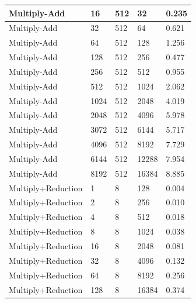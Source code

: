 \documentclass{article}
\begin{document}
\begin{longtable}{|l|l|l|l|l|}
Multiply-Add       & 16   & 512         & 32                & 0.235             \\ \hline
Multiply-Add       & 32   & 512         & 64                & 0.621             \\ \hline
Multiply-Add       & 64   & 512         & 128               & 1.256             \\ \hline
Multiply-Add       & 128  & 512         & 256               & 0.477             \\ \hline
Multiply-Add       & 256  & 512         & 512               & 0.955             \\ \hline
Multiply-Add       & 512  & 512         & 1024              & 2.062             \\ \hline
Multiply-Add       & 1024 & 512         & 2048              & 4.019             \\ \hline
Multiply-Add       & 2048 & 512         & 4096              & 5.978             \\ \hline
Multiply-Add       & 3072 & 512         & 6144              & 5.717             \\ \hline
Multiply-Add       & 4096 & 512         & 8192              & 7.729             \\ \hline
Multiply-Add       & 6144 & 512         & 12288             & 7.954             \\ \hline
Multiply-Add       & 8192 & 512         & 16384             & 8.885             \\ \hline
Multiply+Reduction & 1    & 8           & 128               & 0.004             \\ \hline
Multiply+Reduction & 2    & 8           & 256               & 0.010             \\ \hline
Multiply+Reduction & 4    & 8           & 512               & 0.018             \\ \hline
Multiply+Reduction & 8    & 8           & 1024              & 0.038             \\ \hline
Multiply+Reduction & 16   & 8           & 2048              & 0.081             \\ \hline
Multiply+Reduction & 32   & 8           & 4096              & 0.132             \\ \hline
Multiply+Reduction & 64   & 8           & 8192              & 0.256             \\ \hline
Multiply+Reduction & 128  & 8           & 16384             & 0.374             \\ \hline

\end{longtable}
\end{document}
